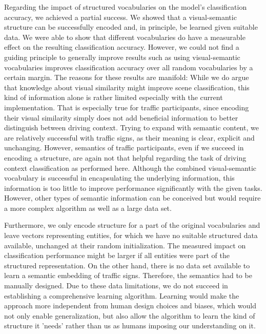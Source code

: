 Regarding the impact of structured vocabularies on the model's classification accuracy, we achieved a partial success.
We showed that a visual-semantic structure can be successfully encoded and, in principle, be learned given suitable data.
We were able to show that different vocabularies do have a measurable effect on the resulting classification accuracy.
However, we could not find a guiding principle to generally improve results such as using visual-semantic vocabularies improves classification accuracy over all random vocabularies by a certain margin.
The reasons for these results are manifold:
While we do argue that knowledge about visual similarity might improve scene classification, this kind of information alone is rather limited especially with the current implementation.
That is especially true for traffic participants, since encoding their visual similarity simply does not add beneficial information to better distinguish between driving context.
Trying to expand with semantic content, we are relatively successful with traffic signs, as their meaning is clear, explicit and unchanging.
However, semantics of traffic participants, even if we succeed in encoding a structure, are again not that helpful regarding the task of driving context classification as performed here.
Although the combined visual-semantic vocabulary is successful in encapsulating the underlying information, this information is too little to improve performance significantly with the given tasks.
However, other types of semantic information can be conceived but would require a more complex algorithm as well as a large data  set.

Furthermore, we only encode structure for a part of the original vocabularies and leave vectors representing entities, for which we have no suitable structured data available, unchanged at their random initialization.
The measured impact on classification performance might be larger if all entities were part of the structured representation.
On the other hand, there is no data set available to learn a semantic embedding of traffic signs.
Therefore, the semantics had to be manually designed.
Due to these data limitations, we do not succeed in establishing a comprehensive learning algorithm.
Learning would make the approach more independent from human design choices and biases, which would not only enable generalization, but also allow the algorithm to learn the kind of structure it 'needs' rather than us as humans imposing our understanding on it.

